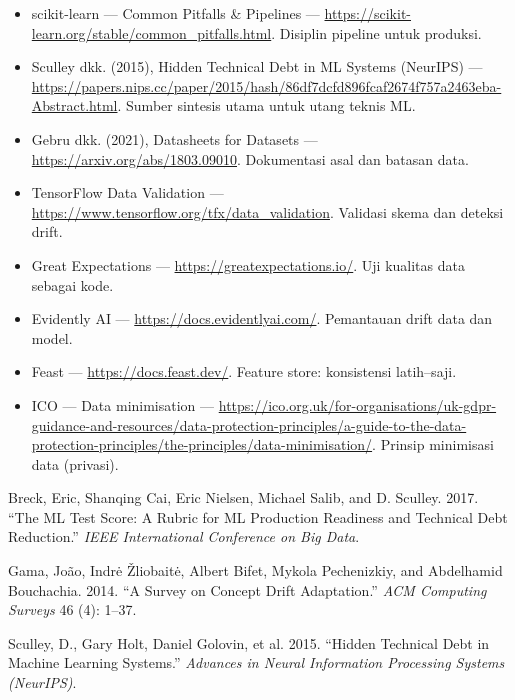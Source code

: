 \begin{bacaan}

\begin{itemize}
\tightlist
\item
  scikit-learn --- Common Pitfalls \& Pipelines --- \url{https://scikit-learn.org/stable/common_pitfalls.html}. Disiplin pipeline untuk produksi.
\item
  Sculley dkk. (2015), Hidden Technical Debt in ML Systems (NeurIPS) --- \url{https://papers.nips.cc/paper/2015/hash/86df7dcfd896fcaf2674f757a2463eba-Abstract.html}. Sumber sintesis utama untuk utang teknis ML.
\item
  Gebru dkk. (2021), Datasheets for Datasets --- \url{https://arxiv.org/abs/1803.09010}. Dokumentasi asal dan batasan data.
\item
  TensorFlow Data Validation --- \url{https://www.tensorflow.org/tfx/data_validation}. Validasi skema dan deteksi drift.
\item
  Great Expectations --- \url{https://greatexpectations.io/}. Uji kualitas data sebagai kode.
\item
  Evidently AI --- \url{https://docs.evidentlyai.com/}. Pemantauan drift data dan model.
\item
  Feast --- \url{https://docs.feast.dev/}. Feature store: konsistensi latih--saji.
\item
  ICO --- Data minimisation --- \url{https://ico.org.uk/for-organisations/uk-gdpr-guidance-and-resources/data-protection-principles/a-guide-to-the-data-protection-principles/the-principles/data-minimisation/}. Prinsip minimisasi data (privasi).
\end{itemize}

\end{bacaan}

\rujukanheading

\protect{}\label{refs}
\begin{CSLReferences}{1}{1}
Breck, Eric, Shanqing Cai, Eric Nielsen, Michael Salib, and D. Sculley. 2017. {``The {ML} Test Score: A Rubric for {ML} Production Readiness and Technical Debt Reduction.''} \emph{IEEE International Conference on Big Data}.

Gama, João, Indrė Žliobaitė, Albert Bifet, Mykola Pechenizkiy, and Abdelhamid Bouchachia. 2014. {``A Survey on Concept Drift Adaptation.''} \emph{ACM Computing Surveys} 46 (4): 1--37.

Sculley, D., Gary Holt, Daniel Golovin, et al. 2015. {``Hidden Technical Debt in Machine Learning Systems.''} \emph{Advances in Neural Information Processing Systems (NeurIPS)}.

\end{CSLReferences}
